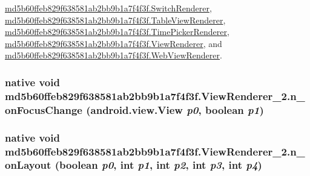 \hyperlink{classmd5b60ffeb829f638581ab2bb9b1a7f4f3f_1_1_switch_renderer_88c5734750b36ec1ff059a1db489262c}{md5b60ffeb829f638581ab2bb9b1a7f4f3f.SwitchRenderer}, \hyperlink{classmd5b60ffeb829f638581ab2bb9b1a7f4f3f_1_1_table_view_renderer_79caaf19be816b7fff9c8bc03b0cc805}{md5b60ffeb829f638581ab2bb9b1a7f4f3f.TableViewRenderer}, \hyperlink{classmd5b60ffeb829f638581ab2bb9b1a7f4f3f_1_1_time_picker_renderer_dc6b30a3a46eab5938559e8d3c3674c2}{md5b60ffeb829f638581ab2bb9b1a7f4f3f.TimePickerRenderer}, \hyperlink{classmd5b60ffeb829f638581ab2bb9b1a7f4f3f_1_1_view_renderer_a03a52443eaab5b1890013945129a8e2}{md5b60ffeb829f638581ab2bb9b1a7f4f3f.ViewRenderer}, and \hyperlink{classmd5b60ffeb829f638581ab2bb9b1a7f4f3f_1_1_web_view_renderer_554c17e18aeffc2dcd3b9899551fd449}{md5b60ffeb829f638581ab2bb9b1a7f4f3f.WebViewRenderer}.\hypertarget{classmd5b60ffeb829f638581ab2bb9b1a7f4f3f_1_1_view_renderer__2_94c144057c065fa69c86c0549ec422ff}{
\subsubsection[{n\_\-onFocusChange}]{\setlength{\rightskip}{0pt plus 5cm}native void md5b60ffeb829f638581ab2bb9b1a7f4f3f.ViewRenderer\_\-2.n\_\-onFocusChange (android.view.View {\em p0}, \/  boolean {\em p1})}}
\label{classmd5b60ffeb829f638581ab2bb9b1a7f4f3f_1_1_view_renderer__2_94c144057c065fa69c86c0549ec422ff}


\hypertarget{classmd5b60ffeb829f638581ab2bb9b1a7f4f3f_1_1_view_renderer__2_40c528ea52e22dd29fa541de43c0a010}{
\subsubsection[{n\_\-onLayout}]{\setlength{\rightskip}{0pt plus 5cm}native void md5b60ffeb829f638581ab2bb9b1a7f4f3f.ViewRenderer\_\-2.n\_\-onLayout (boolean {\em p0}, \/  int {\em p1}, \/  int {\em p2}, \/  int {\em p3}, \/  int {\em p4})}}
\label{classmd5b60ffeb829f638581ab2bb9b1a7f4f3f_1_1_view_renderer__2_40c528ea52e22dd29fa541de43c0a010}




